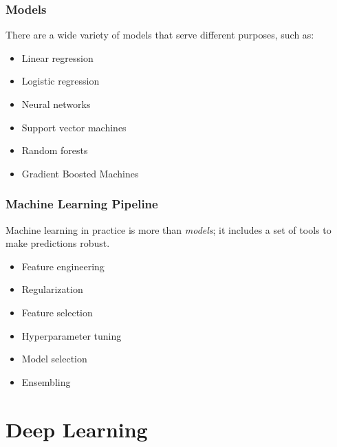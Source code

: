 \documentclass{beamer}
\begin{document}
\begin{frame}
\frametitle{Models}

There are a wide variety of models that serve different purposes, such as:

\begin{itemize}
  \item Linear regression
  \item Logistic regression
  \item Neural networks
  \item Support vector machines
  \item Random forests
  \item Gradient Boosted Machines
\end{itemize}

\end{frame}

\begin{frame}
\frametitle{Machine Learning Pipeline}

Machine learning in practice is more than \emph{models}; it includes a set of tools to make predictions robust.


\vspace{0.25in}

\begin{itemize}
\item Feature engineering
\item Regularization
\item Feature selection
\item Hyperparameter tuning
\item Model selection
\item Ensembling
\end{itemize}

\end{frame}


\section{Deep Learning} 

{
\usebackgroundtemplate{%
\parbox[c][\paperheight][c]{\paperwidth}{
\begin{figure}[H]
\begin{center}
\end{center}
\end{figure}
}
}

}
\end{document}
